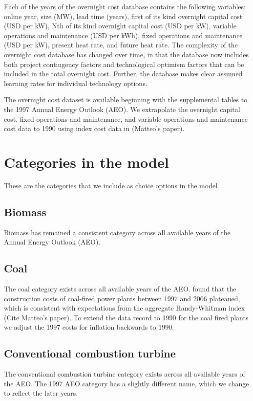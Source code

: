 \documentclass[10pt]{report}
\begin{document}
Each of the years of the overnight cost database contains the following variables: online year, size (MW), lead time (years), first of its kind overnight capital cost (USD per kW), Nth of its kind overnight capital cost (USD per kW), variable operations and maintenance (USD per kWh), fixed operations and maintenance (USD per kW), present heat rate, and future heat rate. 
The complexity of the overnight cost database has changed over time, in that the database now includes both project contingency factors and technological optimism factors that can be included in the total overnight cost. 
Further, the database makes clear assumed learning rates for individual technology options. 

The overnight cost dataset is available beginning with the supplemental tables to the 1997 Annual Energy Outlook (AEO). 
We extrapolate the overnight capital cost, fixed operations and maintenance, and variable operations and maintenance cost data to 1990 using index cost data in \parencite{}(Matteo's paper). 

\section{Categories in the model}
These are the categories that we include as choice options in the model.

\subsection{Biomass}
Biomass has remained a consistent category across all available years of the Annual Energy Outlook (AEO). 

\subsection{Coal}
The coal category exists across all available years of the AEO.  
\cite{mcnerney2011historical} found that the construction costs of coal-fired power plants between 1997 and 2006 plateaued, which is consistent with expectations from the aggregate Handy-Whitman index \parencite{}(Cite Matteo's paper).
To extend the data record to 1990 for the coal fired plants we adjust the 1997 costs for inflation backwards to 1990. 
 
\subsection{Conventional combustion turbine}
The conventional combustion turbine category exists across all available years of the AEO.
The 1997 AEO category has a slightly different name, which we change to reflect the later years.  
\end{document}
